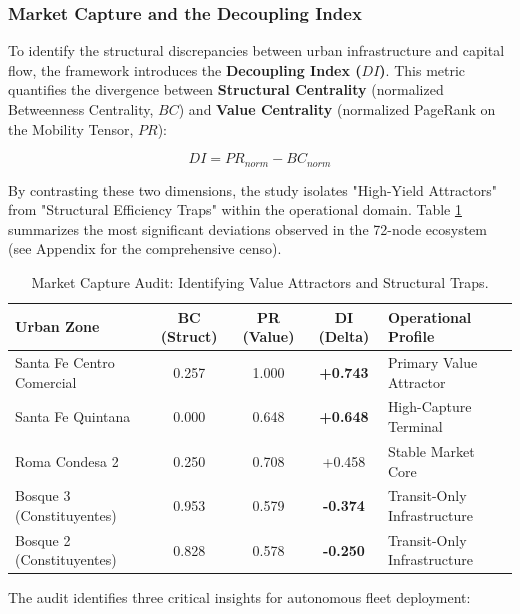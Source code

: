 \subsubsection{Market Capture and the Decoupling Index}

To identify the structural discrepancies between urban infrastructure and capital flow, the framework introduces the \textbf{Decoupling Index ($DI$)}. This metric quantifies the divergence between \textbf{Structural Centrality} (normalized Betweenness Centrality, $BC$) and \textbf{Value Centrality} (normalized PageRank on the Mobility Tensor, $PR$):

\begin{equation}
    DI = PR_{norm} - BC_{norm}
\end{equation}

By contrasting these two dimensions, the study isolates "High-Yield Attractors" from "Structural Efficiency Traps" within the operational domain. Table \ref{tab:capture_highlights} summarizes the most significant deviations observed in the 72-node ecosystem (see Appendix for the comprehensive censo).

\begin{table}[H]
    \centering
    \small
    \begin{tabularx}{\textwidth}{l c c c X}
        \toprule
        \textbf{Urban Zone} & \textbf{BC (Struct)} & \textbf{PR (Value)} & \textbf{DI (Delta)} & \textbf{Operational Profile} \\
        \midrule
        Santa Fe Centro Comercial & 0.257 & 1.000 & \textbf{+0.743} & Primary Value Attractor \\
        Santa Fe Quintana & 0.000 & 0.648 & \textbf{+0.648} & High-Capture Terminal \\
        Roma Condesa 2 & 0.250 & 0.708 & +0.458 & Stable Market Core \\
        Bosque 3 (Constituyentes) & 0.953 & 0.579 & \textbf{-0.374} & Transit-Only Infrastructure \\
        Bosque 2 (Constituyentes) & 0.828 & 0.578 & \textbf{-0.250} & Transit-Only Infrastructure \\
        \bottomrule
    \end{tabularx}
    \caption{Market Capture Audit: Identifying Value Attractors and Structural Traps.}
    \label{tab:capture_highlights}
\end{table}

The audit identifies three critical insights for autonomous fleet deployment:

